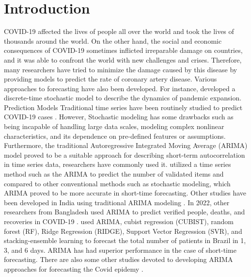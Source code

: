\documentclass{article}
\begin{document}
\section{Introduction}
COVID-19 affected the lives of people all over the world and took the lives of thousands around the world. On the other hand, the social and economic consequences of COVID-19 sometimes inflicted irreparable damage on countries, and it was able to confront the world with new challenges and crises. Therefore, many researchers have tried to minimize the damage caused by this disease by providing models to predict the rate of coronary artery disease. Various approaches to forecasting have also been developed. For instance, \cite{He2020ADS} developed a discrete-time stochastic model to describe the dynamics of pandemic expansion. Prediction Models Traditional time series have been routinely studied to predict COVID-19 cases \cite{kucharski2020early, wu2020nowcasting, zhuang2020preliminary}. However, Stochastic modeling has some drawbacks such as being incapable of handling large data scales, modeling complex nonlinear characteristics, and its dependence on pre-defined features or assumptions\cite{ihme2020forecasting}. Furthermore, the traditional Autoregressive Integrated Moving Average (ARIMA) model proved to be a suitable approach for describing short-term autocorrelation in time series data, researchers have commonly used it. \cite{collou2019digitalization}  utilized a  time series method such as the ARIMA to predict the number of validated items and compared to other conventional methods such as stochastic modeling, which ARIMA proved to be more accurate in short-time forecasting. Other studies have been developed in India using traditional ARIMA modeling \cite{gupta2020trend}. In 2022, other researchers from Bangladesh used ARIMA to predict verified people, deaths, and recoveries in COVID-19 \cite{nesa2022forecasting}. \cite{ribeiro2020short} used ARIMA, cubist regression (CUBIST), random forest (RF), Ridge Regression (RIDGE), Support Vector Regression (SVR), and stacking-ensemble learning to forecast the total number of patients in Brazil in 1, 3, and 6 days.  ARIMA has had superior performance in the case of short-time forecasting. There are also some other studies devoted to developing ARIMA approaches for forecasting the Covid epidemy \cite{roy2021spatial,kufel2020arima,singh2020development,moftakhar2020exponentially, liu2020predicting, duan2020arima, arunkumar2021forecasting}.\\
\end{document}
